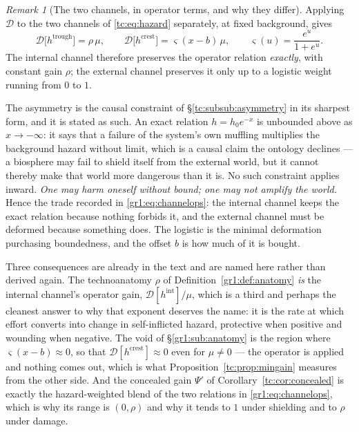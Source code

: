 \documentclass[11pt]{article}
\numberwithin{equation}{section}
\theoremstyle{plain}
\theoremstyle{definition}
\theoremstyle{remark}
\newtheorem{remark}[theorem]{Remark}
\begin{document}
\begin{remark}[The two channels, in operator terms, and why they differ]
\label{gr1:rem:channelsoperator}
Applying $\mathcal D$ to the two channels of \eqref{tc:eq:hazard}
separately, at fixed background, gives
\begin{equation}\label{gr1:eq:channelops}
\mathcal D\bigl[h^{\mathrm{trough}}\bigr]=\rho\,\mu,
\qquad
\mathcal D\bigl[h^{\mathrm{crest}}\bigr]=\varsigma(x-b)\,\mu,
\qquad
\varsigma(u)=\frac{e^{u}}{1+e^{u}} .
\end{equation}
The internal channel therefore preserves the operator relation
\emph{exactly}, with constant gain $\rho$; the external channel
preserves it only up to a logistic weight running from $0$ to $1$.

The asymmetry is the causal constraint of
\S\ref{tc:subsub:asymmetry} in its sharpest form, and it is stated as such. An exact relation $h=h_0e^{-x}$ is unbounded above as
$x\to-\infty$: it says that a failure of the system's own muffling
multiplies the background hazard without limit, which is a causal claim
the ontology declines --- a biosphere may fail to shield itself from the
external world, but it cannot thereby make that world more dangerous
than it is. No such constraint applies inward. \emph{One may harm
oneself without bound; one may not amplify the world.} Hence the trade
recorded in \eqref{gr1:eq:channelops}: the internal channel keeps the
exact relation because nothing forbids it, and the external channel must
be deformed because something does. The logistic is the minimal
deformation purchasing boundedness, and the offset $b$ is how much of it
is bought.

Three consequences are already in the text and are named here rather
than derived again. The technoanatomy $\rho$ of
Definition~\ref{gr1:def:anatomy} \emph{is} the internal channel's
operator gain, $\mathcal D[h^{\mathrm{int}}]/\mu$, which is a third and
perhaps the cleanest answer to why that exponent deserves the name: it
is the rate at which effort converts into change in self-inflicted
hazard, protective when positive and wounding when negative. The void
of \S\ref{gr1:sub:anatomy} is the region where $\varsigma(x-b)\approx0$,
so that $\mathcal D[h^{\mathrm{crest}}]\approx0$ even for $\mu\neq0$ ---
the operator is applied and nothing comes out, which is what
Proposition~\ref{tc:prop:mingain} measures from the other side. And the
concealed gain $\Psi'$ of Corollary~\ref{tc:cor:concealed} is exactly
the hazard-weighted blend of the two relations in
\eqref{gr1:eq:channelops}, which is why its range is $(0,\rho)$ and why
it tends to $1$ under shielding and to $\rho$ under damage.
\end{remark}
\end{document}
